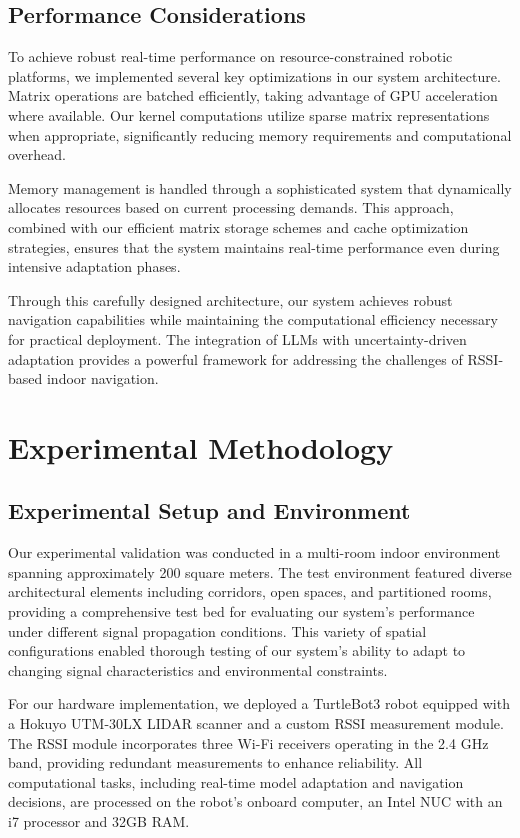 \documentclass[12pt]{article}
\begin{document}
\subsection{Performance Considerations}

To achieve robust real-time performance on resource-constrained robotic platforms, we implemented several key optimizations in our system architecture. Matrix operations are batched efficiently, taking advantage of GPU acceleration where available. Our kernel computations utilize sparse matrix representations when appropriate, significantly reducing memory requirements and computational overhead.

Memory management is handled through a sophisticated system that dynamically allocates resources based on current processing demands. This approach, combined with our efficient matrix storage schemes and cache optimization strategies, ensures that the system maintains real-time performance even during intensive adaptation phases.

Through this carefully designed architecture, our system achieves robust navigation capabilities while maintaining the computational efficiency necessary for practical deployment. The integration of LLMs with uncertainty-driven adaptation provides a powerful framework for addressing the challenges of RSSI-based indoor navigation.

\section{Experimental Methodology}

\subsection{Experimental Setup and Environment}

Our experimental validation was conducted in a multi-room indoor environment spanning approximately 200 square meters. The test environment featured diverse architectural elements including corridors, open spaces, and partitioned rooms, providing a comprehensive test bed for evaluating our system's performance under different signal propagation conditions. This variety of spatial configurations enabled thorough testing of our system's ability to adapt to changing signal characteristics and environmental constraints.

For our hardware implementation, we deployed a TurtleBot3 robot equipped with a Hokuyo UTM-30LX LIDAR scanner and a custom RSSI measurement module. The RSSI module incorporates three Wi-Fi receivers operating in the 2.4 GHz band, providing redundant measurements to enhance reliability. All computational tasks, including real-time model adaptation and navigation decisions, are processed on the robot's onboard computer, an Intel NUC with an i7 processor and 32GB RAM.
\end{document}
